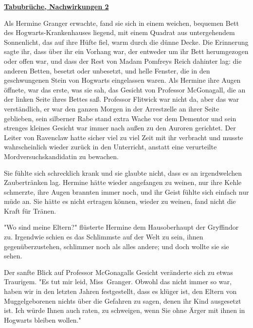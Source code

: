 

\hypertarget{tabubruxfcche-nachwirkungen-2}{%

\textbf{\uline{Tabubrüche, Nachwirkungen 2}}

Als Hermine Granger erwachte, fand sie sich in einem weichen, bequemen Bett des Hogwarts-Krankenhauses liegend, mit einem Quadrat aus untergehendem Sonnenlicht, das auf ihre Hüfte fiel, warm durch die dünne Decke. Die Erinnerung sagte ihr, dass über ihr ein Vorhang war, der entweder um ihr Bett herumgezogen oder offen war, und dass der Rest von Madam Pomfreys Reich dahinter lag: die anderen Betten, besetzt oder unbesetzt, und helle Fenster, die in den geschwungenen Stein von Hogwarts eingelassen waren. Als Hermine ihre Augen öffnete, war das erste, was sie sah, das Gesicht von Professor McGonagall, die an der linken Seite ihres Bettes saß. Professor Flitwick war nicht da, aber das war verständlich, er war den ganzen Morgen in der Arrestzelle an ihrer Seite geblieben, sein silberner Rabe stand extra Wache vor dem Dementor und sein strenges kleines Gesicht war immer nach außen zu den Auroren gerichtet. Der Leiter von Ravenclaw hatte sicher viel zu viel Zeit mit ihr verbracht und musste wahrscheinlich wieder zurück in den Unterricht, anstatt eine verurteilte Mordversuchskandidatin zu bewachen.

Sie fühlte sich schrecklich krank und sie glaubte nicht, dass es an irgendwelchen Zaubertränken lag. Hermine hätte wieder angefangen zu weinen, nur ihre Kehle schmerzte, ihre Augen brannten immer noch, und ihr Geist fühlte sich einfach nur müde an. Sie hätte es nicht ertragen können, wieder zu weinen, fand nicht die Kraft für Tränen.

"Wo sind meine Eltern?" flüsterte Hermine dem Hausoberhaupt der Gryffindor zu. Irgendwie schien es das Schlimmste auf der Welt zu sein, ihnen gegenüberzustehen, schlimmer noch als alles andere; und doch wollte sie sie sehen.

Der sanfte Blick auf Professor McGonagalls Gesicht veränderte sich zu etwas Traurigem. "Es tut mir leid, Miss~Granger. Obwohl das nicht immer so war, haben wir in den letzten Jahren festgestellt, dass es klüger ist, den Eltern von Muggelgeborenen nichts über die Gefahren zu sagen, denen ihr Kind ausgesetzt ist. Ich würde Ihnen auch raten, zu schweigen, wenn Sie ohne Ärger mit ihnen in Hogwarts bleiben wollen."

}
